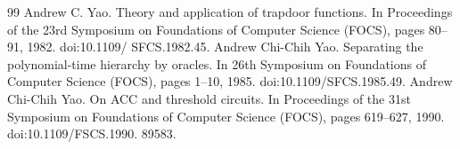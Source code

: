 \documentclass[10pt,a4paper]{article}
\begin{document}
\begin{thebibliography}{99}
 Andrew C. Yao. Theory and application of trapdoor functions. In Proceedings of the 23rd Symposium on Foundations of Computer Science (FOCS), pages 80–91, 1982. doi:10.1109/ SFCS.1982.45.
 Andrew Chi-Chih Yao. Separating the polynomial-time hierarchy by oracles. In 26th Symposium on Foundations of Computer Science (FOCS), pages 1–10, 1985. doi:10.1109/SFCS.1985.49.
 Andrew Chi-Chih Yao. On ACC and threshold circuits. In Proceedings of the 31st Symposium on Foundations of Computer Science (FOCS), pages 619–627, 1990. doi:10.1109/FSCS.1990. 89583.
\end{thebibliography}
\end{document}
